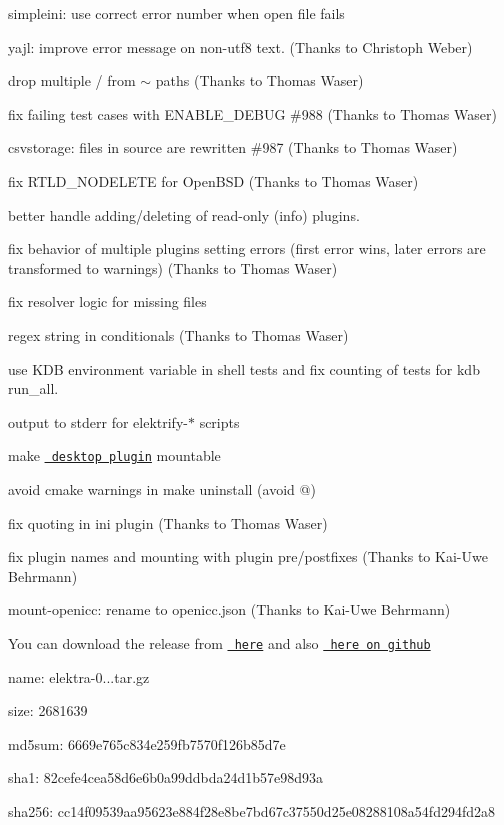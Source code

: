 \begin{DoxyItemize}
\item simpleini\+: use correct error number when open file fails
\item yajl\+: improve error message on non-\/utf8 text. (Thanks to Christoph Weber)
\item drop multiple {\ttfamily /} from {\ttfamily $\sim$} paths (Thanks to Thomas Waser)
\item fix failing test cases with {\ttfamily E\+N\+A\+B\+L\+E\+\_\+\+D\+E\+B\+UG} \#988 (Thanks to Thomas Waser)
\item csvstorage\+: files in source are rewritten \#987 (Thanks to Thomas Waser)
\item fix R\+T\+L\+D\+\_\+\+N\+O\+D\+E\+L\+E\+TE for Open\+B\+SD (Thanks to Thomas Waser)
\item better handle adding/deleting of read-\/only (info) plugins.
\item fix behavior of multiple plugins setting errors (first error wins, later errors are transformed to warnings) (Thanks to Thomas Waser)
\item fix resolver logic for missing files
\item regex string in conditionals (Thanks to Thomas Waser)
\item use {\ttfamily K\+DB} environment variable in shell tests and fix counting of tests for {\ttfamily kdb run\+\_\+all}.
\item output to {\ttfamily stderr} for {\ttfamily elektrify-\/$\ast$} scripts
\item make \href{https://master.libelektra.org/src/plugins/desktop}{\texttt{ desktop plugin}} mountable
\item avoid cmake warnings in {\ttfamily make uninstall} (avoid {\ttfamily @})
\item fix quoting in ini plugin (Thanks to Thomas Waser)
\item fix plugin names and mounting with plugin pre/postfixes (Thanks to Kai-\/\+Uwe Behrmann)
\item mount-\/openicc\+: rename to openicc.\+json (Thanks to Kai-\/\+Uwe Behrmann)
\end{DoxyItemize}

You can download the release from \href{https://www.libelektra.org/ftp/elektra/releases/elektra-0.8.19.tar.gz}{\texttt{ here}} and also \href{https://github.com/ElektraInitiative/ftp/tree/master/releases/elektra-0.8.19.tar.gz}{\texttt{ here on github}}


\begin{DoxyItemize}
\item name\+: elektra-\/0...\+tar.\+gz
\item size\+: 2681639
\item md5sum\+: 6669e765c834e259fb7570f126b85d7e
\item sha1\+: 82cefe4cea58d6e6b0a99ddbda24d1b57e98d93a
\item sha256\+: cc14f09539aa95623e884f28e8be7bd67c37550d25e08288108a54fd294fd2a8
\end{DoxyItemize}

